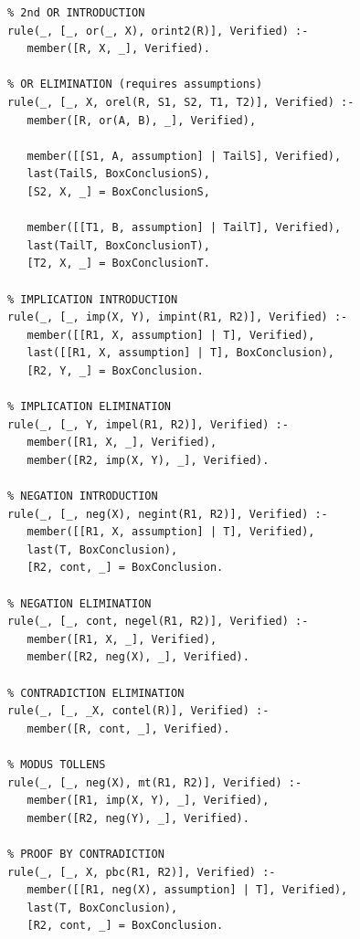 \documentclass[a4paper, 11pt]{article}
\begin{document}
\begin{lstlisting}
% 2nd OR INTRODUCTION
rule(_, [_, or(_, X), orint2(R)], Verified) :-
   member([R, X, _], Verified).

% OR ELIMINATION (requires assumptions)
rule(_, [_, X, orel(R, S1, S2, T1, T2)], Verified) :-
   member([R, or(A, B), _], Verified),
   
   member([[S1, A, assumption] | TailS], Verified),
   last(TailS, BoxConclusionS),
   [S2, X, _] = BoxConclusionS,

   member([[T1, B, assumption] | TailT], Verified),
   last(TailT, BoxConclusionT),
   [T2, X, _] = BoxConclusionT.

% IMPLICATION INTRODUCTION
rule(_, [_, imp(X, Y), impint(R1, R2)], Verified) :-
   member([[R1, X, assumption] | T], Verified),
   last([[R1, X, assumption] | T], BoxConclusion),
   [R2, Y, _] = BoxConclusion.

% IMPLICATION ELIMINATION
rule(_, [_, Y, impel(R1, R2)], Verified) :-
   member([R1, X, _], Verified),
   member([R2, imp(X, Y), _], Verified).

% NEGATION INTRODUCTION
rule(_, [_, neg(X), negint(R1, R2)], Verified) :-
   member([[R1, X, assumption] | T], Verified),
   last(T, BoxConclusion),
   [R2, cont, _] = BoxConclusion.

% NEGATION ELIMINATION
rule(_, [_, cont, negel(R1, R2)], Verified) :-
   member([R1, X, _], Verified),
   member([R2, neg(X), _], Verified).

% CONTRADICTION ELIMINATION
rule(_, [_, _X, contel(R)], Verified) :-
   member([R, cont, _], Verified).

% MODUS TOLLENS
rule(_, [_, neg(X), mt(R1, R2)], Verified) :-
   member([R1, imp(X, Y), _], Verified),
   member([R2, neg(Y), _], Verified).

% PROOF BY CONTRADICTION
rule(_, [_, X, pbc(R1, R2)], Verified) :-
   member([[R1, neg(X), assumption] | T], Verified),
   last(T, BoxConclusion),
   [R2, cont, _] = BoxConclusion.
\end{lstlisting}
\end{document}
